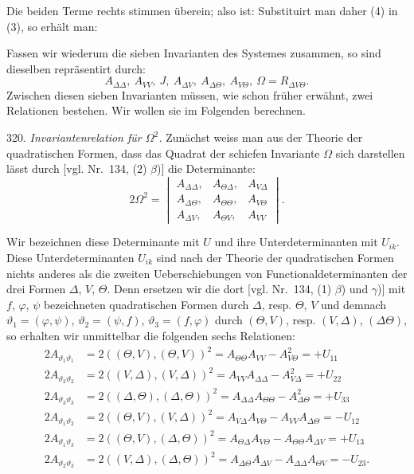 Die beiden Terme rechts stimmen überein; also ist:
Substituirt man daher (4) in (3), so erhält man:

Fassen wir wiederum die sieben Invarianten des Systemes zusammen, so
sind dieselben repräsentirt durch:
\[
A_{\Delta\Delta}, \ A_{VV}, \ J, \ A_{\Delta V}, \ A_{\Delta\Theta}, \ A_{V\Theta}, \ \Omega = R_{\Delta V\Theta}.
\]
Zwischen diesen sieben Invarianten müssen, wie schon früher erwähnt,
zwei Relationen bestehen. Wir wollen sie im Folgenden berechnen.

320. \textit{Invariantenrelation für $\Omega^2$.} Zunächst weiss man aus
der Theorie der quadratischen Formen, dass das Quadrat der schiefen
Invariante $\Omega$ sich darstellen lässt durch [vgl. Nr.\ 134, (2)
$\beta$)] die Determinante:
\[
2\Omega^2 = \begin{vmatrix}
A_{\Delta\Delta}, & A_{\Theta\Delta}, & A_{V\Delta} \\
A_{\Delta\Theta}, & A_{\Theta\Theta}, & A_{V\Theta} \\
A_{\Delta V}, & A_{\Theta V}, & A_{VV}
\end{vmatrix}.
\]

Wir bezeichnen diese Determinante mit $U$ und ihre Unterdeterminanten mit
$U_{ik}$. Diese Unterdeterminanten $U_{ik}$ sind nach der Theorie der
quadratischen Formen nichts anderes als die zweiten Ueberschiebungen von
Functionaldeterminanten der drei Formen $\Delta$, $V$, $\Theta$. Denn
ersetzen wir die dort [vgl. Nr.\ 134, (1) $\beta$) und $\gamma$)] mit
$f$, $\varphi$, $\psi$ bezeichneten quadratischen Formen durch $\Delta$,
resp. $\Theta$, $V$ und demnach $\vartheta_1 = (\varphi,\psi)$,
$\vartheta_2 = (\psi,f)$, $\vartheta_3 = (f,\varphi)$ durch $(\Theta,V)$,
resp. $(V,\Delta)$, $(\Delta\Theta)$, so erhalten wir unmittelbar die
folgenden sechs Relationen:
\[
\begin{aligned}
2A_{\vartheta_1\vartheta_1} &= 2((\Theta,V),(\Theta,V))^2 = A_{\Theta\Theta}A_{VV} - A_{V\Theta}^2 = +U_{11}\\
2A_{\vartheta_2\vartheta_2} &= 2((V,\Delta),(V,\Delta))^2 = A_{VV}A_{\Delta\Delta} - A_{V\Delta}^2 = +U_{22}\\
2A_{\vartheta_3\vartheta_3} &= 2((\Delta,\Theta),(\Delta,\Theta))^2 = A_{\Delta\Delta}A_{\Theta\Theta} - A_{\Delta\Theta}^2 = +U_{33}\\
2A_{\vartheta_1\vartheta_2} &= 2((\Theta,V),(V,\Delta))^2 = A_{V\Delta}A_{V\Theta} - A_{VV}A_{\Delta\Theta} = -U_{12}\\
2A_{\vartheta_1\vartheta_3} &= 2((\Theta,V),(\Delta,\Theta))^2 = A_{\Theta\Delta}A_{V\Theta} - A_{\Theta\Theta}A_{\Delta V} = +U_{13}\\
2A_{\vartheta_2\vartheta_3} &= 2((V,\Delta),(\Delta,\Theta))^2 = A_{\Delta\Theta}A_{\Delta V} - A_{\Delta\Delta}A_{\Theta V} = -U_{23}.
\end{aligned}
\]

